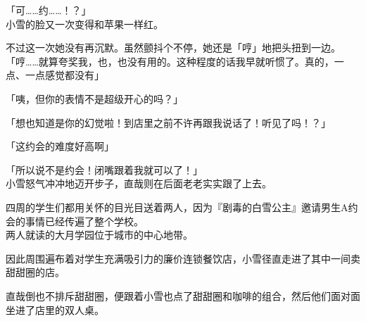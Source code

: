 「可……约……！？」\\

小雪的脸又一次变得和苹果一样红。

不过这一次她没有再沉默。虽然颤抖个不停，她还是「哼」地把头扭到一边。\\

「哼……就算夸奖我，也，也没有用的。这种程度的话我早就听惯了。真的，一点、一点感觉都没有」

「咦，但你的表情不是超级开心的吗？」

「想也知道是你的幻觉啦！到店里之前不许再跟我说话了！听见了吗！？」

「这约会的难度好高啊」

「所以说不是约会！闭嘴跟着我就可以了！」\\

小雪怒气冲冲地迈开步子，直哉则在后面老老实实跟了上去。

四周的学生们都用关怀的目光目送着两人，因为『剧毒的白雪公主』邀请男生A约会的事情已经传遍了整个学校。\\

两人就读的大月学园位于城市的中心地带。

因此周围遍布着对学生充满吸引力的廉价连锁餐饮店，小雪径直走进了其中一间卖甜甜圈的店。

直哉倒也不排斥甜甜圈，便跟着小雪也点了甜甜圈和咖啡的组合，然后他们面对面坐进了店里的双人桌。\\

